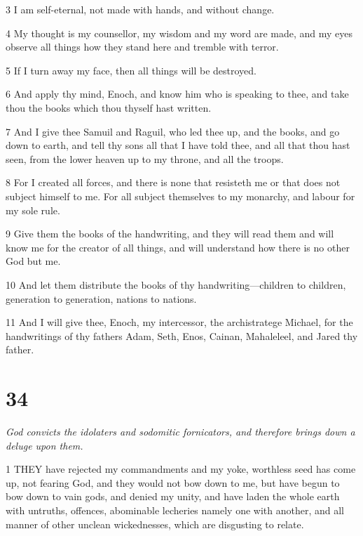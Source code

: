 \par 3 I am self-eternal, not made with hands, and without change.

\par 4 My thought is my counsellor, my wisdom and my word are made, and my eyes observe all things how they stand here and tremble with terror.

\par 5 If I turn away my face, then all things will be destroyed.

\par 6 And apply thy mind, Enoch, and know him who is speaking to thee, and take thou the books which thou thyself hast written.

\par 7 And I give thee Samuil and Raguil, who led thee up, and the books, and go down to earth, and tell thy sons all that I have told thee, and all that thou hast seen, from the lower heaven up to my throne, and all the troops.

\par 8 For I created all forces, and there is none that resisteth me or that does not subject himself to me. For all subject themselves to my monarchy, and labour for my sole rule.

\par 9 Give them the books of the handwriting, and they will read them and will know me for the creator of all things, and will understand how there is no other God but me.

\par 10 And let them distribute the books of thy handwriting—children to children, generation to generation, nations to nations.

\par 11 And I will give thee, Enoch, my intercessor, the archistratege Michael, for the handwritings of thy fathers Adam, Seth, Enos, Cainan, Mahaleleel, and Jared thy father.

\chapter{34}

\par \textit{God convicts the idolaters and sodomitic fornicators, and therefore brings down a deluge upon them.}

\par 1 THEY have rejected my commandments and my yoke, worthless seed has come up, not fearing God, and they would not bow down to me, but have begun to bow down to vain gods, and denied my unity, and have laden the whole earth with untruths, offences, abominable lecheries namely one with another, and all manner of other unclean wickednesses, which are disgusting to relate.


